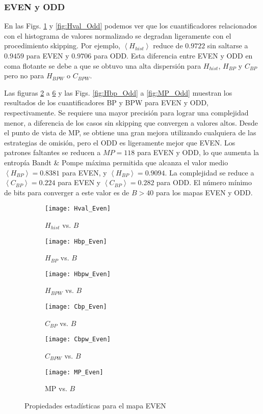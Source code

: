 \subsubsection{EVEN y ODD} \label{sssec:skipp}

En las Figs. \ref{fig:Hval_Even} y \ref{fig:Hval_Odd} podemos ver que los cuantificadores relacionados con el histograma de valores normalizado se degradan ligeramente con el procedimiento skipping.
Por ejemplo, $\left \langle H_{hist} \right \rangle$ reduce de $0.9722$ sin saltarse a $0.9459$ para EVEN y $0.9706$ para ODD.
Esta diferencia entre EVEN y ODD en coma flotante se debe a que se obtuvo una alta dispersión para $H_{hist}$, $H_{BP}$ y $C_{BP}$ pero no para $H_{BPW}$ o $C_{BPW}$.

Las figuras \ref{fig:Hbp_Even} a \ref{fig:MP_Even} y las Figs. \ref{fig:Hbp_Odd} a \ref{fig:MP_Odd} muestran los resultados de los cuantificadores BP y BPW para EVEN y ODD, respectivamente.
Se requiere una mayor precisión para lograr una complejidad menor, a diferencia de los casos sin skipping que convergen a valores altos.
Desde el punto de vista de MP, se obtiene una gran mejora utilizando cualquiera de las estrategias de omisión, pero el ODD es ligeramente mejor que EVEN.
Los patrones faltantes se reducen a $MP = 118$ para EVEN y ODD, lo que aumenta la entropía Bandt \& Pompe máxima permitida que alcanza el valor medio $\left \langle H_{BP} \right \rangle = 0.8381$ para EVEN, y $ \left \langle H_{BP} \right \rangle = 0.9094$.
La complejidad se reduce a $\left \langle C_{BP} \right \rangle = 0.224$ para EVEN y $\left \langle C_{BP} \right \rangle = 0.282$ para ODD.
El número mínimo de bits para converger a este valor es de $ B> 40 $ para los mapas EVEN y ODD.
%
\begin{figure}[htpb]
	\centering
	\begin{subfigure}[b]{0.49\textwidth}
		\texttt{[image: Hval\_Even]}
		\caption{$H_{hist}$ vs. $B$}
		\label{fig:Hval_Even}
	\end{subfigure}
	\begin{subfigure}[b]{0.49\textwidth}
		\texttt{[image: Hbp\_Even]}
		\caption{$H_{BP}$ vs. $B$}
		\label{fig:Hbp_Even}
	\end{subfigure}
	\begin{subfigure}[b]{0.49\textwidth}
		\texttt{[image: Hbpw\_Even]}
		\caption{$H_{BPW}$ vs. $B$}
		\label{fig:Hbpw_Even}
	\end{subfigure}
	\begin{subfigure}[b]{0.49\textwidth}
		\texttt{[image: Cbp\_Even]}
		\caption{$C_{BP}$ vs. $B$}
		\label{fig:Cbp_Even}
	\end{subfigure}
	\begin{subfigure}[b]{0.49\textwidth}
		\texttt{[image: Cbpw\_Even]}
		\caption{$C_{BPW}$ vs. $B$}
		\label{fig:Cbpw_Even}
	\end{subfigure}
	\begin{subfigure}[b]{0.49\textwidth}
		\texttt{[image: MP\_Even]}
		\caption{MP vs. $B$}
		\label{fig:MP_Even}
	\end{subfigure}
	\caption{Propiedades estadísticas para el mapa EVEN}
	\label{fig:EVEN_QuantiB}
\end{figure}
